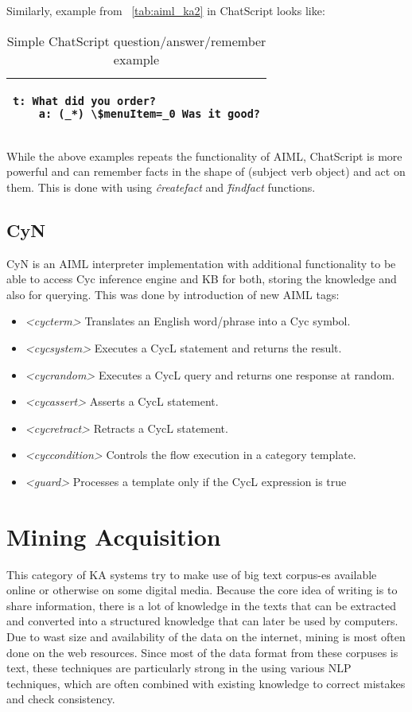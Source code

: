 Similarly, example from \tablename~\ref{tab:aiml_ka2} in ChatScript looks like:

\begin{table}[H]
	\caption{Simple ChatScript question/answer/remember example}
	\label{tab:chatscript_ka2}
	\centering
	\begin{tabular}{l}
		\hline
		\lstset{breaklines=true}
		\begin{lstlisting}
t: What did you order?
	a: (_*) \$menuItem=_0 Was it good?
		\end{lstlisting}  \\
		\hline
	\end{tabular}
\end{table}

While the above examples repeats the functionality of AIML, ChatScript is more 
powerful and can remember facts in the shape of (subject verb object) and act on
them. This is done with using \emph{\^createfact} and \emph{\^findfact} 
functions.


\subsection {CyN} 
\label{section:rw_CyN}
CyN is an AIML interpreter implementation with additional functionality
to be able to access Cyc inference engine and KB for both, storing the knowledge 
and also for querying\parencite{Coursey2004}. This was done by introduction of new AIML tags:
\begin{itemize}
	\item \emph{<cycterm>} Translates an English word/phrase into a Cyc symbol.
	\item \emph{<cycsystem>} Executes a CycL statement and returns the result.
	\item \emph{<cycrandom>} Executes a CycL query and returns one response at random.
	\item \emph{<cycassert>} Asserts a CycL statement.
	\item \emph{<cycretract>} Retracts a CycL statement.
	\item \emph{<cyccondition>} Controls the flow execution in a category template.
	\item \emph{<guard>} Processes a template only if the CycL expression is true
\end{itemize} 

\section{Mining Acquisition}
\label{section:MiningAcquisition}
This category of KA systems try to make use of big text corpus-es 
available online or otherwise on some digital media. Because the core idea of 
writing is to share information, there is a lot of knowledge in the texts that 
can be extracted and converted into a structured knowledge that can later be used 
by computers. Due to wast size and availability of the data on the internet,
mining is most often done on the web resources. Since most of the data format
from these corpuses is text, these techniques are particularly strong in the
using various NLP techniques, which are often combined with existing knowledge
to correct mistakes and check consistency.

